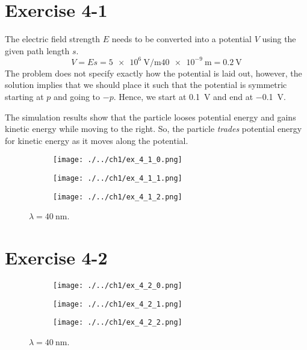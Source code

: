\clearpage



\newpage
\section{Exercise 4-1}

The electric field strength $E$ needs to be converted into a potential $V$
using the given path length $s$. 
\[
	V = E s
	  = \SI{5e6}{\volt\per\meter} \SI{40e-9}{\meter}
	  = \SI{0.2}{\volt}
\]
The problem does not specify exactly how the potential is laid out,
however, the solution implies that we should place it such that the
potential is symmetric starting at $p$ and going to $-p$. Hence,
we start at \SI{0.1}{\volt} and end at \SI{-0.1}{\volt}.

The simulation results show that the particle looses potential energy
and gains kinetic energy while moving to the right. So, the particle
\emph{trades} potential energy for kinetic energy as it moves along
the potential.

\begin{figure}
	\centering
	\begin{subfigure}{1\linewidth}
		\texttt{[image: ./../ch1/ex\_4\_1\_0.png]}
	\end{subfigure}
	
	\begin{subfigure}{1\linewidth}
		\texttt{[image: ./../ch1/ex\_4\_1\_1.png]}
	\end{subfigure}
	
	\begin{subfigure}{1\linewidth}
		\texttt{[image: ./../ch1/ex\_4\_1\_2.png]}
	\end{subfigure}
	
	\caption{$\lambda = \SI{40}{\nano\m}$.}
	\label{fig:ex_4_1}
\end{figure}

\clearpage



\newpage
\section{Exercise 4-2}

\begin{figure}
	\centering
	\begin{subfigure}{1\linewidth}
		\texttt{[image: ./../ch1/ex\_4\_2\_0.png]}
	\end{subfigure}
	
	\begin{subfigure}{1\linewidth}
		\texttt{[image: ./../ch1/ex\_4\_2\_1.png]}
	\end{subfigure}
	
	\begin{subfigure}{1\linewidth}
		\texttt{[image: ./../ch1/ex\_4\_2\_2.png]}
	\end{subfigure}
	
	\caption{$\lambda = \SI{40}{\nano\m}$.}
	\label{fig:ex_4_2}
\end{figure}

\clearpage

